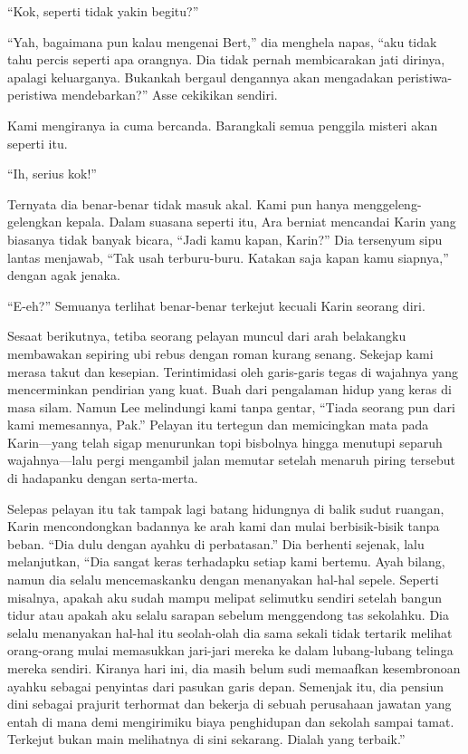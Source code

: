 \documentclass[smalldemyvopaper,11pt,twoside,onecolumn,openright,extrafontsizes]{memoir}
\begin{document}
``Kok, seperti tidak yakin begitu?''


``Yah, bagaimana pun kalau mengenai Bert,'' dia menghela napas, ``aku tidak tahu percis seperti apa orangnya. Dia tidak pernah membicarakan jati dirinya, apalagi keluarganya. Bukankah bergaul dengannya akan mengadakan peristiwa-peristiwa mendebarkan?'' Asse cekikikan sendiri.

Kami mengiranya ia cuma bercanda. Barangkali semua penggila misteri akan seperti itu.

``Ih, serius kok!''


Ternyata dia benar-benar tidak masuk akal. Kami pun hanya menggeleng-gelengkan kepala. Dalam suasana seperti itu, Ara berniat mencandai Karin yang biasanya tidak banyak bicara, ``Jadi kamu kapan, Karin?'' Dia tersenyum sipu lantas menjawab, ``Tak usah terburu-buru. Katakan saja kapan kamu siapnya,'' dengan agak jenaka.

``E-eh?'' Semuanya terlihat benar-benar terkejut kecuali Karin seorang diri.


Sesaat berikutnya, tetiba seorang pelayan muncul dari arah belakangku membawakan sepiring ubi rebus dengan roman kurang senang. Sekejap kami merasa takut dan kesepian. Terintimidasi oleh garis-garis tegas di wajahnya yang mencerminkan pendirian yang kuat. Buah dari pengalaman hidup yang keras di masa silam. Namun Lee melindungi kami tanpa gentar, ``Tiada seorang pun dari kami memesannya, Pak.'' Pelayan itu tertegun dan memicingkan mata pada Karin---yang telah sigap menurunkan topi bisbolnya hingga menutupi separuh wajahnya---lalu pergi mengambil jalan memutar setelah menaruh piring tersebut di hadapanku dengan serta-merta.


Selepas pelayan itu tak tampak lagi batang hidungnya di balik sudut ruangan, Karin mencondongkan badannya ke arah kami dan mulai berbisik-bisik tanpa beban. ``Dia dulu dengan ayahku di perbatasan.'' Dia berhenti sejenak, lalu melanjutkan, ``Dia sangat keras terhadapku setiap kami bertemu. Ayah bilang, namun dia selalu mencemaskanku dengan menanyakan hal-hal sepele. Seperti misalnya, apakah aku sudah mampu melipat selimutku sendiri setelah bangun tidur atau apakah aku selalu sarapan sebelum menggendong tas sekolahku. Dia selalu menanyakan hal-hal itu seolah-olah dia sama sekali tidak tertarik melihat orang-orang mulai memasukkan jari-jari mereka ke dalam lubang-lubang telinga mereka sendiri. Kiranya hari ini, dia masih belum sudi memaafkan kesembronoan ayahku sebagai penyintas dari pasukan garis depan. Semenjak itu, dia pensiun dini sebagai prajurit terhormat dan bekerja di sebuah perusahaan jawatan yang entah di mana demi mengirimiku biaya penghidupan dan sekolah sampai tamat. Terkejut bukan main melihatnya di sini sekarang. Dialah yang terbaik.''
\end{document}
